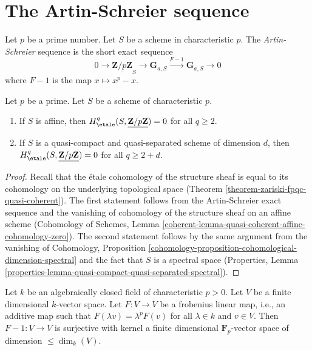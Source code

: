 \section{The Artin-Schreier sequence}
\label{section-artin-schreier}

\noindent
Let $p$ be a prime number. Let $S$ be a scheme in characteristic $p$.
The {\it Artin-Schreier} sequence is the short exact sequence
$$
0 \longrightarrow \underline{\mathbf{Z}/p\mathbf{Z}}_S \longrightarrow
\mathbf{G}_{a, S} \xrightarrow{F-1} \mathbf{G}_{a, S} \longrightarrow 0
$$
where $F - 1$ is the map $x \mapsto x^p - x$.

\begin{lemma}
\label{lemma-vanishing-affine-char-p-p}
Let $p$ be a prime. Let $S$ be a scheme of characteristic $p$.
\begin{enumerate}
\item If $S$ is affine, then
$H_\etale^q(S, \underline{\mathbf{Z}/p\mathbf{Z}}) = 0$ for all
$q \geq 2$.
\item If $S$ is a quasi-compact and quasi-separated scheme of
dimension $d$, then $H_\etale^q(S, \underline{\mathbf{Z}/p\mathbf{Z}}) = 0$
for all $q \geq 2 + d$.
\end{enumerate}
\end{lemma}

\begin{proof}
Recall that the \'etale cohomology of the structure sheaf is equal
to its cohomology on the underlying topological space
(Theorem \ref{theorem-zariski-fpqc-quasi-coherent}).
The first statement follows from the Artin-Schreier exact sequence
and the vanishing of cohomology of the structure sheaf on an affine
scheme (Cohomology of Schemes, Lemma
\ref{coherent-lemma-quasi-coherent-affine-cohomology-zero}).
The second statement follows by the same argument from
the vanishing of Cohomology, Proposition
\ref{cohomology-proposition-cohomological-dimension-spectral}
and the fact that $S$ is a spectral space
(Properties, Lemma
\ref{properties-lemma-quasi-compact-quasi-separated-spectral}).
\end{proof}

\begin{lemma}
\label{lemma-F-1}
Let $k$ be an algebraically closed field of characteristic $p > 0$.
Let $V$ be a finite dimensional $k$-vector space. Let $F : V \to V$
be a frobenius linear map, i.e., an additive map such that
$F(\lambda v) = \lambda^p F(v)$ for all $\lambda \in k$ and $v \in V$.
Then $F - 1 : V \to V$ is surjective with kernel a finite dimensional
$\mathbf{F}_p$-vector space of dimension $\leq \dim_k(V)$.
\end{lemma}

